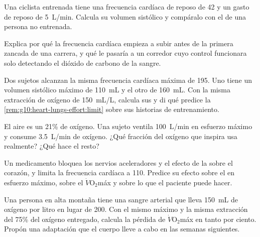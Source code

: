 \begin{exercise}[$\star\star$]\label{exo:g10:heart-lungs-effort:10}
Una ciclista entrenada tiene una frecuencia cardíaca de reposo de 42 y
un gasto de reposo de \qty{5}{L/min}. Calcula su volumen sistólico y
compáralo con el de una persona no entrenada.
\end{exercise}

\begin{exercise}[$\star\star$]\label{exo:g10:heart-lungs-effort:11}
Explica por qué la frecuencia cardíaca empieza a subir antes de la
primera zancada de una carrera, y qué le pasaría a un corredor cuyo
control funcionara solo detectando el dióxido de carbono de la sangre.
\end{exercise}

\begin{exercise}[$\star\star\star$]\label{exo:g10:heart-lungs-effort:12}
Dos sujetos alcanzan la misma frecuencia cardíaca máxima de 195. Uno
tiene un volumen sistólico máximo de \qty{110}{mL} y el otro de
\qty{160}{mL}. Con la misma extracción de oxígeno de \qty{150}{mL/L},
calcula sus  y di qué predice la
\cref{rem:g10:heart-lungs-effort:limit} sobre sus historias de
entrenamiento.
\end{exercise}

\begin{exercise}[$\star\star\star$]\label{exo:g10:heart-lungs-effort:13}
El aire es un 21\% de oxígeno. Una sujeto ventila \qty{100}{L/min} en
esfuerzo máximo y consume \qty{3.5}{L/min} de oxígeno. ¿Qué fracción
del oxígeno que inspira usa realmente? ¿Qué hace el resto?
\end{exercise}

\begin{exercise}[$\star\star\star$]\label{exo:g10:heart-lungs-effort:14}
Un medicamento bloquea los nervios aceleradores y el efecto de la
 sobre el corazón, y limita la frecuencia cardíaca a 110.
Predice su efecto sobre el  en esfuerzo máximo, sobre el
$\dot V\!\mathrm{O_2}$máx y sobre lo que el paciente puede hacer.
\end{exercise}

\begin{exercise}[$\star\star\star$]\label{exo:g10:heart-lungs-effort:15}
Una persona en alta montaña tiene una sangre arterial que lleva
\qty{150}{mL} de oxígeno por litro en lugar de \num{200}. Con el mismo
 máximo y la misma extracción del 75\% del oxígeno
entregado, calcula la pérdida de $\dot V\!\mathrm{O_2}$máx en tanto por
ciento. Propón una adaptación que el cuerpo lleve a cabo en las semanas
siguientes.
\end{exercise}

